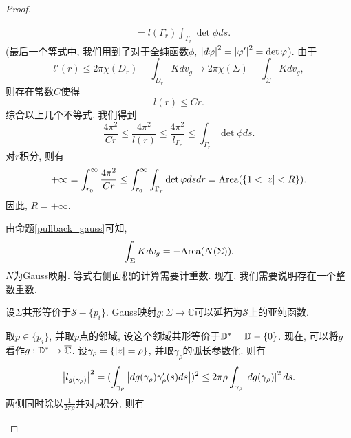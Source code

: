 \begin{proof}
\begin{claim}
\begin{subproof}
\begin{equation}
\begin{split}
                    & =l(\Gamma_r)\int_{\Gamma_r}\det \phi ds.
                \end{split}
            \end{equation}
            (最后一个等式中, 我们用到了对于全纯函数$\phi$, $\left | d\varphi \right |^2 = \left | \varphi' \right |^2= \det \varphi$). 由于
            \begin{equation}
                l'(r) \le 2\pi\chi(D_r) - \int_{D_r}Kdv_g \to 2\pi\chi(\Sigma) - \int_\Sigma K dv_g,
            \end{equation}
            则存在常数$C$使得 
            \begin{equation}
                l(r) \le Cr.
            \end{equation}
            综合以上几个不等式, 我们得到
            \begin{equation}
                \frac{4\pi^2}{Cr} \le \frac{4\pi^2}{l(r)} \le \frac{4\pi^2}{l_{\Gamma_r}} \le \int_{\Gamma_r}\det\phi ds.
            \end{equation}
            对$r$积分, 则有
            \begin{equation}
                +\infty = \int^\infty_{r_0} \frac{4\pi^2}{Cr} \le \int^\infty_{r_0}\int_{\Gamma_r} \det\varphi dsdr = \text{Area}(\{1<\left | z \right |< R\}).
            \end{equation}
            因此, $R=+\infty$. 
        \end{subproof}
    \end{claim}
    由命题\eqref{pullback_gauss}可知,
    \begin{equation}
        \int_\Sigma K dv_g = - \text{Area}(N(\Sigma)).
    \end{equation}
    $N$为Gauss映射. 等式右侧面积的计算需要计重数. 现在, 我们需要说明存在一个整数重数. 
    \begin{claim}
        设$\Sigma$共形等价于$\mathcal{S}-\{p_i\}$.  Gauss映射$g: \Sigma\to \overline{\mathbb{C}}$可以延拓为$\mathcal{S}$上的亚纯函数.
        \begin{subproof}
            取$p \in \{p_i\}$, 并取$p$点的邻域, 设这个领域共形等价于${\mathbb{D}}^*={\mathbb{D}} - \{0\}$. 现在, 可以将$g$看作$g: {\mathbb{D}}^* \to \overline{\mathbb{C}}$. 设$\gamma_\rho=\{\left | z \right |=\rho\}$, 并取$\gamma_\rho$的弧长参数化. 则有
            \begin{equation}
                \left | l_{g(\gamma_\rho)} \right |^2 = (\int_{\gamma_\rho} \left | dg(\gamma_\rho) \gamma'_\rho(s) ds \right |)^2 \le 2\pi\rho \int_{\gamma_\rho}\left | dg(\gamma_\rho) \right |^2ds.
            \end{equation}
            两侧同时除以$\frac{1}{2\pi\rho}$并对$\rho$积分, 则有

\end{subproof}
\end{claim}
\end{proof}
